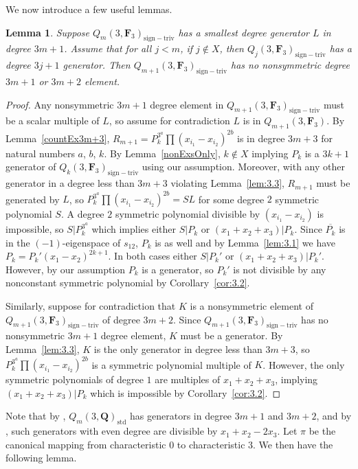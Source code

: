 \documentclass[pdftex]{sigma}
\newtheorem{Lemma}[Theorem]{Lemma}
\theoremstyle{definition}
\numberwithin{equation}{section}
\newcommand{\std}{\mathrm{std}}
\newcommand{\siv}{\mathrm{sign-triv}}
\begin{document}
We now introduce a few useful lemmas.

\begin{Lemma}\label{notInm+1}
 Suppose $Q_m(3,\mathbf{F}_3)_{\siv}$ has a smallest degree generator $L$ in degree $3m+1$. Assume that for all $j<m$, if $j\not\in X$, then $Q_j(3,\mathbf{F}_3)_\siv$ has a degree $3j+1$ generator. Then $Q_{m+1}(3,\mathbf{F}_3)_{\siv}$ has no nonsymmetric degree $3m+1$ or $3m+2$ element.
\end{Lemma}
\begin{proof}
 Any nonsymmetric $3m+1$ degree element in $Q_{m+1}(3,\mathbf{F}_3)_{\siv}$ must be a scalar multiple of $L$, so assume for contradiction $L$ is in $Q_{m+1}(3,\mathbf{F}_3)$. By Lemma~\ref{countEx3m+3}, $R_{m+1}=P_k^{3^a}\prod(x_{i_1}-x_{i_2})^{2b}$ is in degree $3m+3$ for natural numbers $a$, $b$, $k$. By Lemma~\ref{nonExsOnly}, $k\not\in X$ implying $P_k$ is a $3k+1$ generator of $Q_k(3,\mathbf{F}_3)_{\siv}$ using our assumption. Moreover, with any other generator in a degree less than $3m+3$ violating Lemma~\ref{lem:3.3}, $R_{m+1}$ must be generated by $L$, so $P_k^{3^a}\prod(x_{i_1}-x_{i_2})^{2b}=SL$ for some degree $2$ symmetric polynomial $S$. A degree $2$ symmetric polynomial divisible by $(x_{i_1}-x_{i_2})$ is impossible, so $S|P_k^{3^a}$ which implies either $S|P_k$ or $(x_1+x_2+x_3)|P_k$. Since $\overline{P_{k}}$ is in the $(-1)$-eigenspace of $s_{12}$, $P_{k}$ is as well and by Lemma~\ref{lem:3.1} we have $P_k=P_k'(x_1-x_2)^{2k+1}$. In both cases either $S|P_k'$ or $(x_1+x_2+x_3)|P_k'$. However, by our assumption $P_k$ is a generator, so $P_k'$ is not divisible by any nonconstant symmetric polynomial by Corollary~\ref{cor:3.2}.

 Similarly, suppose for contradiction that $K$ is a nonsymmetric element of $Q_{m+1}(3,\mathbf{F}_3)_{\siv}$ of degree $3m+2$. Since $Q_{m+1}(3,\mathbf{F}_3)_{\siv}$ has no nonsymmetric $3m+1$ degree element, $K$ must be a generator. By Lemma~\ref{lem:3.3}, $K$ is the only generator in degree less than $3m+3$, so $P_k^{3^a}\prod(x_{i_1}-x_{i_2})^{2b}$ is a symmetric polynomial multiple of $K$. However, the only symmetric polynomials of degree $1$ are multiples of $x_1+x_2+x_3$, implying $(x_1+x_2+x_3)|P_k$ which is impossible by Corollary~\ref{cor:3.2}.
\end{proof}

Note that by \cite{felder2001action}, $Q_m(3,\mathbf{Q})_{\std}$ has generators in degree $3m+1$ and $3m+2$, and by \cite{wang2022explicit}, such generators with even degree are divisible by $x_1+x_2-2x_3$. Let $\pi$ be the canonical mapping from characteristic $0$ to characteristic $3$. We then have the following lemma.
\end{document}
